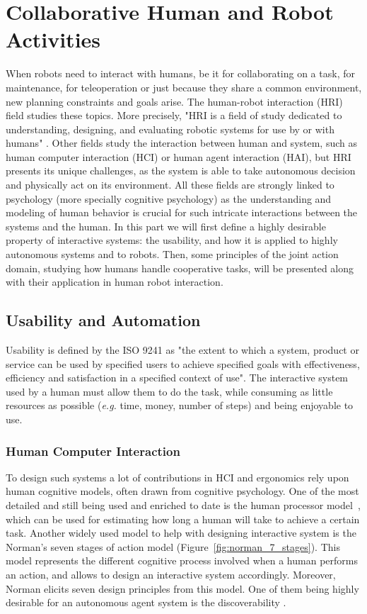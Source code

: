 \documentclass[a4paper,11pt,twoside]{StyleThese}
\begin{document}
\section{Collaborative Human and Robot Activities}
When robots need to interact with humans, be it for collaborating on a task, for maintenance, for teleoperation or just because they share a common environment, new planning constraints and goals arise. The human-robot interaction (HRI) field studies these topics. More precisely, "HRI is a field of study dedicated to understanding, designing, and evaluating robotic systems for use by or with humans" \cite{goodrich_human-robot_2007}. Other fields study the interaction between human and system, such as human computer interaction (HCI) or human agent interaction (HAI), but HRI presents its unique challenges, as the system is able to take autonomous decision and physically act on its environment.
All these fields are strongly linked to psychology (more specially cognitive psychology) as the understanding and modeling of human behavior is crucial for such intricate interactions between the systems and the human.
In this part we will first define a highly desirable property of interactive systems: the usability, and how it is applied to highly autonomous systems and to robots. Then, some principles of the joint action domain, studying how humans handle cooperative tasks, will be presented along with their application in human robot interaction.

\subsection{Usability and Automation}
Usability is defined by the ISO 9241 as "the extent to which a system, product or service can be used by specified users to achieve specified goals with effectiveness, efficiency and satisfaction in a specified context of use". The interactive system used by a human must allow them to do the task, while consuming as little resources as possible (\textit{e.g.} time, money, number of steps) and being enjoyable to use.

\subsubsection{Human Computer Interaction}

To design such systems a lot of contributions in HCI and ergonomics rely upon human cognitive models, often drawn from cognitive psychology. One of the most detailed and still being used and enriched to date is the human processor model~\cite{card1983psychology}, which can be used for estimating how long a human will take to achieve a certain task. Another widely used model to help with designing interactive system is the Norman's seven stages of action model (Figure~\ref{fig:norman_7_stages}). This model represents the different cognitive process involved when a human performs an action, and allows to design an interactive system accordingly. Moreover, Norman elicits seven design principles from this model. One of them being highly desirable for an autonomous agent system is the discoverability \cite{norman2013design}.
\end{document}
